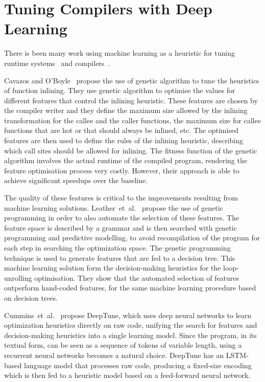 \section{Tuning Compilers with Deep Learning}

There is been many work using machine learning as a heuristic for tuning runtime systems~\cite{andreasson02,wang09,castro11,rocha17,pereira17} and compilers~\cite{cavazos05,leather09,cummins17,wang18,mendis19}.

Cavazos and O'Boyle~\cite{cavazos05} propose the use of genetic algorithm to tune the heuristics of function inlining.
They use genetic algorithm to optimise the values for different features that control the inlining heuristic.
These features are chosen by the compiler writer and they define the maximum size allowed by the inlining transformation for the callee and the caller functions, the maximum size for callee functions that are hot or that should always be inlined, etc.
The optimised features are then used to define the rules of the inlining heuristic, describing which call sites should be allowed for inlining.
The fitness function of the genetic algorithm involves the actual runtime of the compiled program, rendering the feature optimisation process very costly.
However, their approach is able to achieve significant speedups over the baseline.

The quality of these features is critical to the improvements resulting from machine learning solutions.
Leather~et~al.~\cite{leather09} propose the use of genetic programming in order to also automate the selection of these features.
The feature space is described by a grammar and is then searched with genetic programming and predictive modelling, to avoid recompilation of the program for each step in searching the optimization space.
The genetic programming technique is used to generate features that are fed to a decision tree.
This machine learning solution form the decision-making heuristics for the loop-unrolling optimisation.
They show that the automated selection of features outperform hand-coded features, for the same machine learning procedure based on decision trees.

Cummins~et~al.~\cite{cummins17} propose DeepTune, which uses deep neural networks to learn optimization heuristics directly on raw code, unifying the search for features and decision-making heuristics into a single learning model.
Since the program, in its textual form, can be seen as a sequence of tokens of variable length, using a recurrent neural networks becomes a natural choice.
DeepTune has an LSTM-based language model that processes raw code, producing a fixed-size encoding which is then fed to a heuristic model based on a feed-forward neural network.

